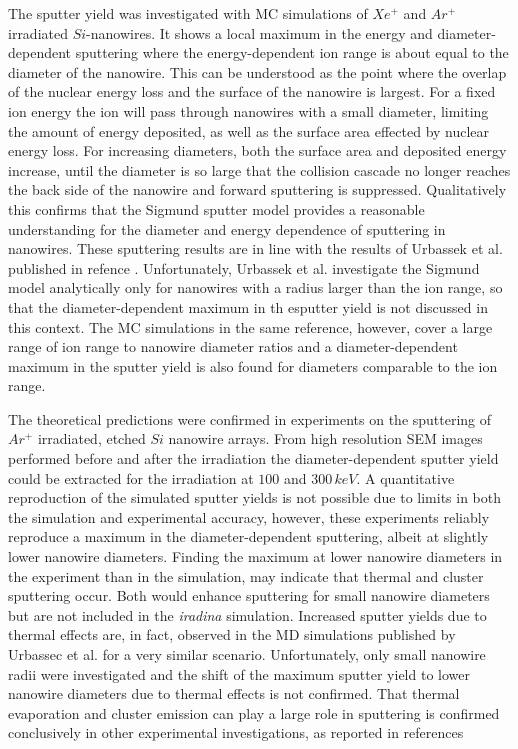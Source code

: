 The sputter yield was investigated with MC simulations of $Xe^+$ and $Ar^+$ irradiated $Si$-nanowires. It shows a local maximum in the energy and diameter-dependent sputtering where the energy-dependent ion range is about equal to the diameter of the nanowire. This can be understood as the point where the overlap of the nuclear energy loss and the surface of the nanowire is largest. For a fixed ion energy the ion will pass through nanowires with a small diameter, limiting the amount of energy deposited, as well as the surface area effected by nuclear energy loss. For increasing diameters, both the surface area and deposited energy increase, until the diameter is so large that the collision cascade no longer reaches the back side of the nanowire and forward sputtering is suppressed. Qualitatively this confirms that the Sigmund sputter model provides a reasonable understanding for the diameter and energy dependence of sputtering in nanowires. These sputtering results are in line with the results of Urbassek et al. published in refence \cite{urbassek_sputter_2015}. Unfortunately, Urbassek et al. investigate the Sigmund model analytically only for nanowires with a radius larger than the ion range, so that the diameter-dependent maximum in th esputter yield is not discussed in this context. The MC simulations in the same reference, however, cover a large range of ion range to nanowire diameter ratios and a diameter-dependent maximum in the sputter yield is also found for diameters comparable to the ion range. 
 
The theoretical predictions were confirmed in experiments on the sputtering of $Ar^+$ irradiated, etched $Si$ nanowire arrays. From high resolution SEM images performed before and after the irradiation the diameter-dependent sputter yield could be extracted for the irradiation at $100$ and $300\,keV$. A quantitative reproduction of the simulated sputter yields is not possible due to limits in both the simulation and experimental accuracy, however, these experiments reliably reproduce a maximum in the diameter-dependent sputtering, albeit at slightly lower nanowire diameters. Finding the maximum at lower nanowire diameters in the experiment than in the simulation, may indicate that thermal and cluster sputtering occur. Both would enhance sputtering for small nanowire diameters but are not included in the \emph{iradina} simulation. Increased sputter yields due to thermal effects are, in fact, observed in the MD simulations published by Urbassec et al. \cite{urbassek_sputter_2015} for a very similar scenario. Unfortunately, only small nanowire radii were investigated and the shift of the maximum sputter yield to lower nanowire diameters due to thermal effects is not confirmed. That thermal evaporation and cluster emission can play a large role in sputtering is confirmed conclusively in other experimental investigations, as reported in references \cite{greaves_enhanced_2013,ilinov_sputtering_2014,anders_sputtering_2015,johannes_ion_2015}


